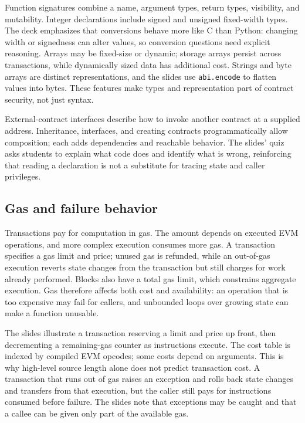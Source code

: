 \documentclass[11pt,a4paper]{article}
\numberwithin{figure}{section}
\begin{document}
Function signatures combine a name, argument types, return types, visibility, and mutability. Integer declarations include signed and unsigned fixed-width types. The deck emphasizes that conversions behave more like C than Python: changing width or signedness can alter values, so conversion questions need explicit reasoning. Arrays may be fixed-size or dynamic; storage arrays persist across transactions, while dynamically sized data has additional cost. Strings and byte arrays are distinct representations, and the slides use \texttt{abi.encode} to flatten values into bytes. These features make types and representation part of contract security, not just syntax.

External-contract interfaces describe how to invoke another contract at a supplied address. Inheritance, interfaces, and creating contracts programmatically allow composition; each adds dependencies and reachable behavior. The slides' quiz asks students to explain what code does and identify what is wrong, reinforcing that reading a declaration is not a substitute for tracing state and caller privileges.

\subsection{Gas and failure behavior}
Transactions pay for computation in gas. The amount depends on executed EVM operations, and more complex execution consumes more gas. A transaction specifies a gas limit and price; unused gas is refunded, while an out-of-gas execution reverts state changes from the transaction but still charges for work already performed. Blocks also have a total gas limit, which constrains aggregate execution. Gas therefore affects both cost and availability: an operation that is too expensive may fail for callers, and unbounded loops over growing state can make a function unusable.

The slides illustrate a transaction reserving a limit and price up front, then decrementing a remaining-gas counter as instructions execute. The cost table is indexed by compiled EVM opcodes; some costs depend on arguments. This is why high-level source length alone does not predict transaction cost. A transaction that runs out of gas raises an exception and rolls back state changes and transfers from that execution, but the caller still pays for instructions consumed before failure. The slides note that exceptions may be caught and that a callee can be given only part of the available gas.
\end{document}
